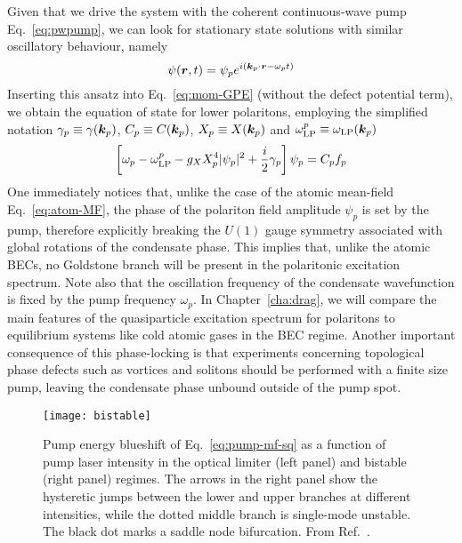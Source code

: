 Given that we drive the system with the coherent continuous-wave pump Eq.~\eqref{eq:pwpump}, we can look for stationary state solutions with similar oscillatory behaviour, namely
%
\begin{equation}\label{eq:pump-ansatz}
  \psi(\bm{r},t) = \psi_p e^{i (\bm{k}_p \cdot \bm{r}- \omega_p t)}
\end{equation}
% 
Inserting this ansatz into Eq.~\eqref{eq:mom-GPE} (without the defect
potential term), we obtain the equation of state for lower polaritons,
employing the simplified notation $\gamma_p \equiv \gamma(\bm{k}_p)$,
$C_p \equiv C(\bm{k}_p)$, $X_p \equiv X(\bm{k}_p)$ and
$\omega^p_{\text{LP}} \equiv \omega_{\text{LP}}(\bm{k}_p)$
%
\begin{equation}\label{eq:pump-mf}
  \left[ \omega_p - \omega^p_{\text{LP}} - g_X X_p^4 \vert \psi_p \vert^2 + \frac{i}{2}\gamma_p\right]\psi_p = C_p f_p
\end{equation}
% 
One immediately notices that, unlike the case of the atomic mean-field
Eq.~\eqref{eq:atom-MF}, the phase of the polariton field amplitude
$\psi_p$ is set by the pump, therefore explicitly breaking the $U(1)$
gauge symmetry associated with global rotations of the condensate
phase. This implies that, unlike the atomic BECs, no Goldstone branch
will be present in the polaritonic excitation spectrum. Note also that
the oscillation frequency of the condensate wavefunction is fixed by
the pump frequency $\omega_p$. In Chapter~\ref{cha:drag}, we will
compare the main features of the quasiparticle excitation spectrum for
polaritons to equilibrium systems like cold atomic gases in the BEC
regime.
Another important consequence of this phase-locking is that experiments concerning
topological phase defects such as vortices and solitons should be
performed with a finite size pump, leaving the condensate phase
unbound outside of the pump spot. 
%
\begin{figure}[tb]\centering
  \texttt{[image: bistable]}
  \caption{
    Pump energy blueshift of Eq.~\eqref{eq:pump-mf-sq} as a function of pump laser intensity in the optical limiter (left panel) and bistable (right panel) regimes. The arrows in the right panel show the hysteretic jumps between the lower and upper branches at different intensities, while the dotted middle branch is single-mode unstable. The black dot marks a saddle node bifurcation. From Ref.~\cite{Wouters_2007_b}.
  }\label{fig:bistable}
\end{figure}
%

